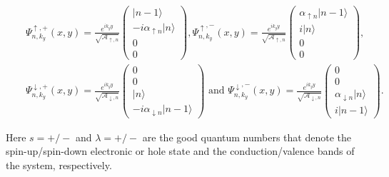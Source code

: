 \documentclass[prb,twocolumn]{revtex4-1}
\renewcommand{\i}{\mathrm{i}}
\begin{document}
\begin{widetext}
	\begin{eqnarray}\label{wave}
	&&	\Psi_{n,k_y}^{\uparrow, +}(x,y)=\frac{e^{ik_yy}}{\sqrt{\mathcal{A}_{\uparrow, n}}}\begin{pmatrix}
	\vert n-1\rangle\\-i\alpha_{\uparrow n}\vert n\rangle\\0\\0
	\end{pmatrix},
	\Psi_{n,k_y}^{\uparrow,-}(x,y)=\frac{e^{ik_yy}}{\sqrt{\mathcal{A}_{\uparrow, n}}}\begin{pmatrix}
	\alpha_{\uparrow n}\vert n-1\rangle\\i\vert n\rangle\\ 0\\0
	\end{pmatrix},\nonumber\\
	&&
	\Psi_{n,k_y}^{\downarrow,+}(x,y)=\frac{e^{ik_yy}}{\sqrt{\mathcal{A}_{\downarrow, n}}}
	\begin{pmatrix}
	0\\0\\\vert n\rangle\\-i\alpha_{\downarrow n}\vert n-1\rangle
	\end{pmatrix}\text{ and }
	\Psi_{n,k_y}^{\downarrow,-}(x,y)=\frac{e^{ik_yy}}{\sqrt{\mathcal{A}_{\downarrow, n}}}\begin{pmatrix}
	0\\0\\\alpha_{\downarrow n}\vert n\rangle\\i\vert n-1\rangle
	\end{pmatrix}.
	\end{eqnarray}
\end{widetext}
Here $s=+/-$ and $\lambda=+/-$ are the good quantum numbers that denote the spin-up/spin-down electronic or hole state and the conduction/valence bands of the system, respectively.
\end{document}
